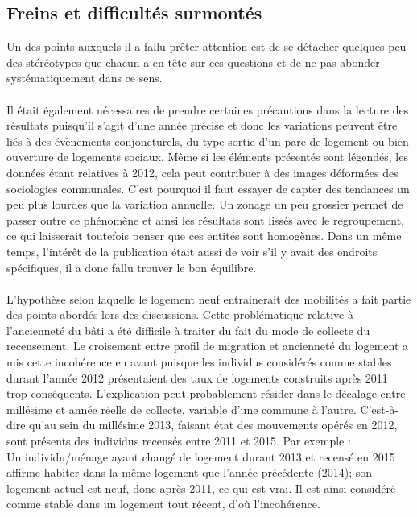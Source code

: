 \documentclass{bredele}
\begin{document}
\subsection{Freins et difficultés surmontés}
Un des points auxquels il a fallu prêter attention est de se détacher quelques peu des stéréotypes que chacun a en tête sur ces questions et de ne pas abonder systématiquement dans ce sens.\\\\
Il était également nécessaires de prendre certaines précautions dans la lecture des résultats puisqu’il s’agit d’une année précise et donc les variations peuvent être liés à des évènements conjoncturels, du type sortie d’un parc de logement ou bien ouverture de logements sociaux. Même si les éléments présentés sont légendés, les données étant relatives à 2012, cela peut contribuer à des images déformées des sociologies communales. C’est pourquoi il faut essayer de capter des tendances un peu plus lourdes que la variation annuelle. Un zonage un peu grossier permet de passer outre ce phénomène et ainsi les résultats sont lissés avec le regroupement, ce qui laisserait toutefois penser que ces entités sont homogènes. Dans un même temps, l’intérêt de la publication était aussi de voir s’il y avait des endroits spécifiques, il a donc fallu trouver le bon équilibre.
\\\\L’hypothèse selon laquelle le logement neuf entrainerait des mobilités a fait partie des points abordés lors des discussions. Cette problématique relative à l'ancienneté du bâti a été difficile à traiter du fait du mode de collecte du recensement. Le croisement entre profil de migration et ancienneté du logement a mis cette incohérence en avant puisque les individus considérés comme stables durant l’année 2012 présentaient des taux de logements construits après 2011 trop conséquents. L’explication peut probablement résider dans le décalage entre millésime et année réelle de collecte, variable d’une commune à l’autre. C'est-à-dire qu’au sein du millésime 2013, faisant état des mouvements opérés en 2012, sont présents des individus recensés entre 2011 et 2015. Par exemple :\\
Un individu/ménage ayant changé de logement durant 2013 et recensé en 2015 affirme habiter dans la même logement que l’année précédente (2014); son logement actuel est neuf, donc après 2011, ce qui est vrai. Il est ainsi considéré comme stable dans un logement tout récent, d'où l'incohérence.\\\\
\end{document}
